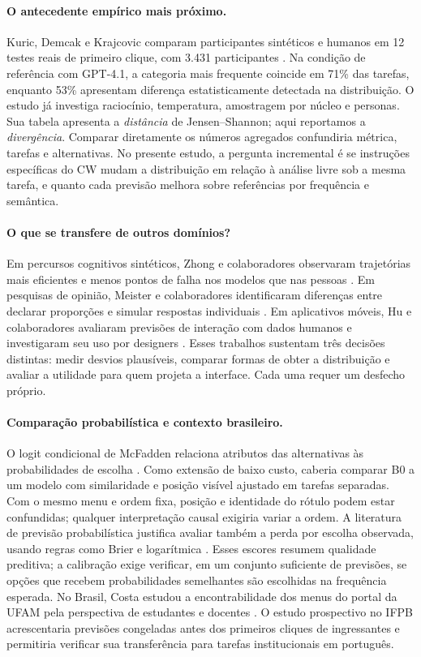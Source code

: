 \documentclass[12pt]{article}
\begin{document}
\paragraph{O antecedente empírico mais próximo.} Kuric, Demcak e Krajcovic comparam participantes sintéticos e humanos em 12 testes reais de primeiro clique, com 3.431 participantes \cite{kuric2026wwgc}. Na condição de referência com GPT-4.1, a categoria mais frequente coincide em 71\% das tarefas, enquanto 53\% apresentam diferença estatisticamente detectada na distribuição. O estudo já investiga raciocínio, temperatura, amostragem por núcleo e personas. Sua tabela apresenta a \emph{distância} de Jensen--Shannon; aqui reportamos a \emph{divergência}. Comparar diretamente os números agregados confundiria métrica, tarefas e alternativas. No presente estudo, a pergunta incremental é se instruções específicas do CW mudam a distribuição em relação à análise livre sob a mesma tarefa, e quanto cada previsão melhora sobre referências por frequência e semântica.

\paragraph{O que se transfere de outros domínios?} Em percursos cognitivos sintéticos, Zhong e colaboradores observaram trajetórias mais eficientes e menos pontos de falha nos modelos que nas pessoas \cite{zhong2025syntheticcw}. Em pesquisas de opinião, Meister e colaboradores identificaram diferenças entre declarar proporções e simular respostas individuais \cite{meister2025}. Em aplicativos móveis, Hu e colaboradores avaliaram previsões de interação com dados humanos e investigaram seu uso por designers \cite{hu2025uitransition}. Esses trabalhos sustentam três decisões distintas: medir desvios plausíveis, comparar formas de obter a distribuição e avaliar a utilidade para quem projeta a interface. Cada uma requer um desfecho próprio.

\paragraph{Comparação probabilística e contexto brasileiro.} O logit condicional de McFadden relaciona atributos das alternativas às probabilidades de escolha \cite{mcfadden1974}. Como extensão de baixo custo, caberia comparar B0 a um modelo com similaridade e posição visível ajustado em tarefas separadas. Com o mesmo menu e ordem fixa, posição e identidade do rótulo podem estar confundidas; qualquer interpretação causal exigiria variar a ordem. A literatura de previsão probabilística justifica avaliar também a perda por escolha observada, usando regras como Brier e logarítmica \cite{gneiting2007}. Esses escores resumem qualidade preditiva; a calibração exige verificar, em um conjunto suficiente de previsões, se opções que recebem probabilidades semelhantes são escolhidas na frequência esperada. No Brasil, Costa estudou a encontrabilidade dos menus do portal da UFAM pela perspectiva de estudantes e docentes \cite{costa2022ufam}. O estudo prospectivo no IFPB acrescentaria previsões congeladas antes dos primeiros cliques de ingressantes e permitiria verificar sua transferência para tarefas institucionais em português.
\end{document}
